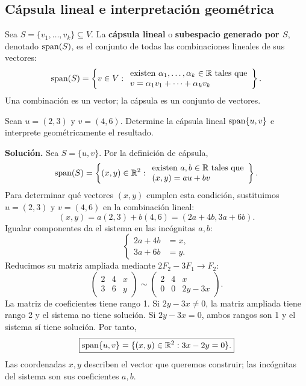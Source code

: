 \documentclass[compacto,10pt]{pubciencias-notas}
\begin{document}
\subsection{Cápsula lineal e interpretación geométrica}
\begin{defi}\label{sem07cl02:capsula}
    Sea $S=\{v_1,\ldots,v_k\}\subseteq V$. La \textbf{cápsula lineal}
    o \textbf{subespacio generado por $S$}, denotado $\operatorname{span}(S)$, es el
    conjunto de todas las combinaciones lineales de sus vectores:
    \[
        \operatorname{span}(S)=\left\{v\in V:
            \begin{array}{l}
                \text{existen }\alpha_1,\ldots,\alpha_k\in\mathbb{R}
                \text{ tales que}\\
                v=\alpha_1v_1+\cdots+\alpha_kv_k
            \end{array}\right\}.
    \]
    Una combinación es un vector; la cápsula es un conjunto de vectores.
\end{defi}

\begin{ejem}\label{sem07cl02:recta}
    Sean $u=(2,3)$ y $v=(4,6)$. Determine la cápsula lineal
    $\operatorname{span}\{u,v\}$ e interprete geométricamente el resultado.

    \textbf{Solución.} Sea $S=\{u,v\}$. Por la definición de cápsula,
    \[
        \operatorname{span}(S)=\left\{(x,y)\in\mathbb{R}^2:
            \begin{array}{l}
                \text{existen }a,b\in\mathbb{R}\text{ tales que}\\
                (x,y)=au+bv
            \end{array}\right\}.
    \]
    Para determinar qué vectores $(x,y)$ cumplen esta condición,
    sustituimos $u=(2,3)$ y $v=(4,6)$ en la combinación lineal:
    \[
        (x,y)=a(2,3)+b(4,6)=(2a+4b,3a+6b).
    \]
    Igualar componentes da el sistema en las incógnitas $a,b$:
    \[
        \left\{\begin{aligned}2a+4b&=x,\\3a+6b&=y.\end{aligned}\right.
    \]
    Reducimos su matriz ampliada mediante $2F_2-3F_1\rightarrow F_2$:
    \[
        \left(\begin{array}{cc|c}2&4&x\\3&6&y\end{array}\right)
        \sim
        \left(\begin{array}{cc|c}2&4&x\\0&0&2y-3x\end{array}\right).
    \]
    La matriz de coeficientes tiene rango 1. Si $2y-3x\ne0$, la matriz
    ampliada tiene rango 2 y el sistema no tiene solución. Si $2y-3x=0$,
    ambos rangos son 1 y el sistema sí tiene solución. Por tanto,
    \[
        \boxed{\operatorname{span}\{u,v\}=\{(x,y)\in\mathbb{R}^2:3x-2y=0\}.}
    \]
    Las coordenadas $x,y$ describen el vector que queremos construir;
    las incógnitas del sistema son sus coeficientes $a,b$.
\end{ejem}
\end{document}

